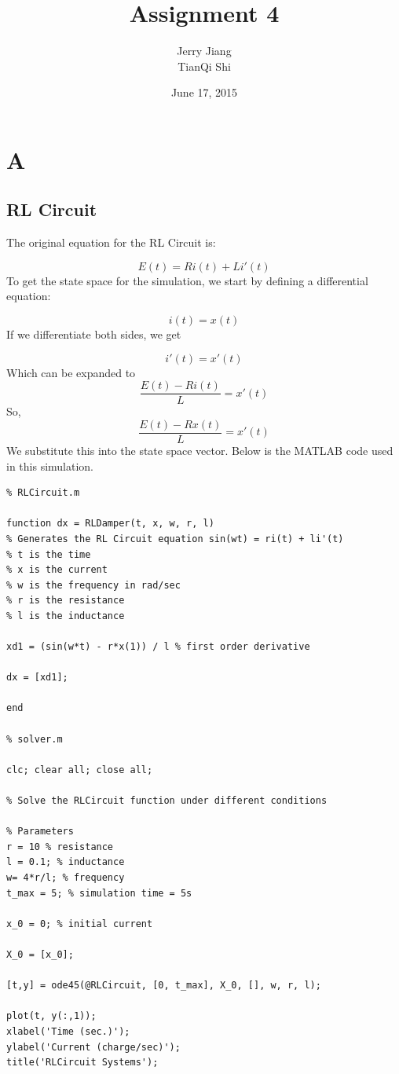 \documentclass[titlepage,12pt]{article}
\title{Assignment 4}
\date{June 17, 2015}
\author{Jerry Jiang\\ TianQi Shi}
\begin{document}
\maketitle

\section*{A}

\subsection*{RL Circuit}

The original equation for the RL Circuit is:

$$E(t) = Ri(t) + Li'(t)$$
To get the state space for the simulation, we start by defining a differential equation:

$$i(t) = x(t)$$
If we differentiate both sides, we get

$$i'(t) = x'(t)$$
Which can be expanded to
$$\frac{E(t) - Ri(t)}{L} = x'(t)$$
So,
$$\frac{E(t) - Rx(t)}{L} = x'(t)$$
We substitute this into the state space vector. Below is the MATLAB code used in this simulation.

\begin{verbatim}
% RLCircuit.m

function dx = RLDamper(t, x, w, r, l)
% Generates the RL Circuit equation sin(wt) = ri(t) + li'(t)
% t is the time
% x is the current
% w is the frequency in rad/sec
% r is the resistance
% l is the inductance

xd1 = (sin(w*t) - r*x(1)) / l % first order derivative

dx = [xd1];

end

% solver.m

clc; clear all; close all;

% Solve the RLCircuit function under different conditions

% Parameters
r = 10 % resistance
l = 0.1; % inductance
w= 4*r/l; % frequency
t_max = 5; % simulation time = 5s

x_0 = 0; % initial current

X_0 = [x_0];

[t,y] = ode45(@RLCircuit, [0, t_max], X_0, [], w, r, l);

plot(t, y(:,1));
xlabel('Time (sec.)');
ylabel('Current (charge/sec)');
title('RLCircuit Systems');

\end{verbatim}
\end{document}
